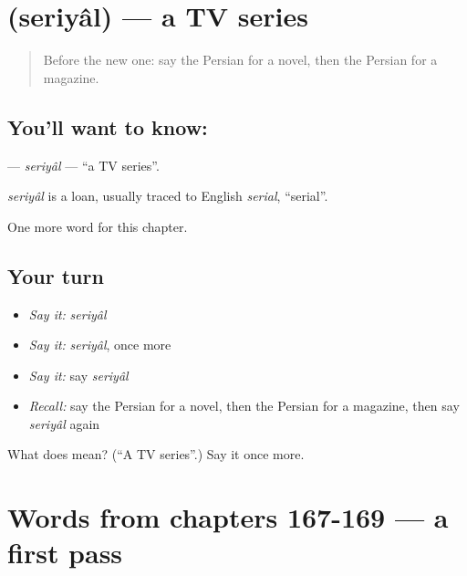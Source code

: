 \section[\texorpdfstring{\fa{سریال} (seriyâl)}{سریال (seriyâl)}]{ (seriyâl) — a TV series}

\label{lesson:FA-C172-seriyal}



\begin{quote}
Before the new one: say the Persian for a novel, then the Persian for a magazine.
\end{quote}

\subsection*{You'll want to know: }
\textbf{} — \emph{seriyâl} — \textquotedblleft{}a TV series\textquotedblright{}.

\begin{cousinweb}
\emph{seriyâl} is a loan, usually traced to English \emph{serial}, \textquotedblleft{}serial\textquotedblright{}.
\end{cousinweb}

\begin{grammarlens}[title={What you've built}]
One more word for this chapter.
\end{grammarlens}

\subsection*{Your turn}
\begin{itemize}
\raggedright
  \item \emph{Say it:} \emph{seriyâl}
  \item \emph{Say it:} \emph{seriyâl}, once more
  \item \emph{Say it:} say \emph{seriyâl}
  \item \emph{Recall:} say the Persian for a novel, then the Persian for a magazine, then say \emph{seriyâl} again
\end{itemize}

\begin{tcolorbox}[breakable,colback=teal!4,colframe=teal!35!black,title={Before you move on}]
What does  mean? (\textquotedblleft{}A TV series\textquotedblright{}.) Say it once more.
\end{tcolorbox}
\section[(dialogue)]{Words from chapters 167-169 — a first pass}

